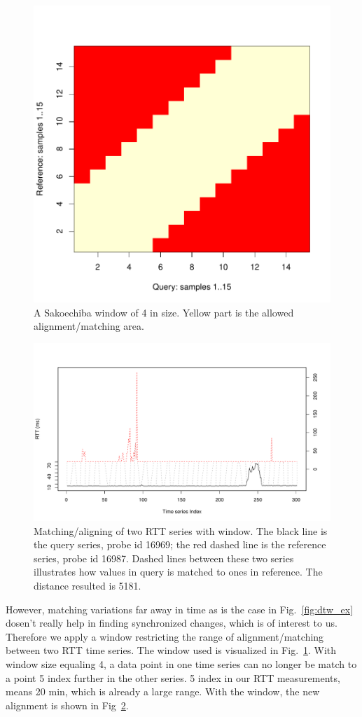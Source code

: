 \begin{figure}[!htb]
\centering
\includegraphics[width=.5\textwidth]{gfx/chap3/win.pdf}
\caption{A Sakoechiba  window \cite{Sakoe1978} of 4 in size. Yellow part is the allowed alignment/matching area.}
\label{fig:win}
\end{figure}

\begin{figure}[!htb]
\centering
\includegraphics[width=.8\textwidth]{gfx/chap3/dtw_ex_win.pdf}
\caption{Matching/aligning of two RTT series with window. The black line is the query series, probe id 16969; the red dashed line is the reference series, probe id 16987. Dashed lines between these two series illustrates how values in query is matched to ones in reference. The distance resulted is 5181.}
\label{fig:dtw_ex_win}
\end{figure}

However, matching variations far away in time as is the case in Fig.~\ref{fig:dtw_ex} dosen't really help in finding synchronized changes, which is of interest to us. Therefore we apply a window restricting the range of alignment/matching between two RTT time series. The window used is visualized in Fig.~\ref{fig:win}. With window size equaling 4, a data point in one time series can no longer be match to a point 5 index further in the other series. 5 index in our RTT measurements, means 20 min, which is already a large range. With the window, the new alignment is shown in Fig~\ref{fig:dtw_ex_win}.

